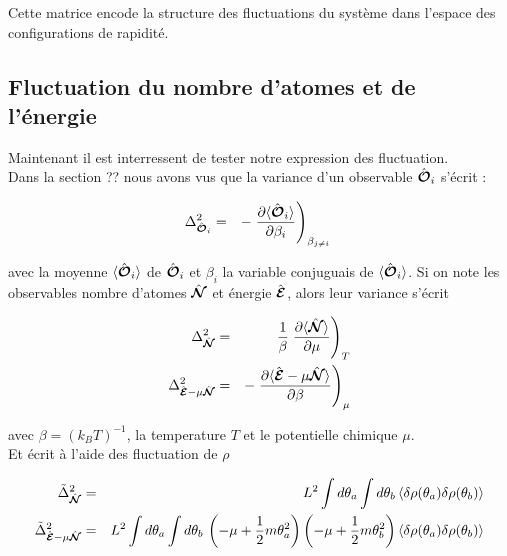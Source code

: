 Cette matrice encode la structure des fluctuations du système dans l’espace des configurations de rapidité.



\subsection{Fluctuation du nombre d'atomes et de l'énergie}

{\color{blue} 
Maintenant il est interressent de tester notre expression des fluctuation.\\
Dans la section {??} nous avons vus que la variance d'un observable $\hat{\bm{\mathcal{O}}}_i$ s'écrit :

\begin{eqnarray*}
	\Delta_{\operator{\mathcal{O}}_i}^2 & = & -  \left . \frac{ \partial \langle \operator{\mathcal{O}}_i \rangle }{ \partial \beta_i } 	 \right )_{\beta_{j \neq i } }
\end{eqnarray*}

avec la moyenne $\langle \hat{\bm{\mathcal{O}}}_i \rangle $ de  $\hat{\bm{\mathcal{O}}}_i$ et $\beta_i$ la variable conjuguais de $\langle \hat{\bm{\mathcal{O}}}_i \rangle $. Si on note les observables nombre d'atomes $\hat{\bm{\mathcal{N}}}$ et énergie $\hat{\bm{\mathcal{E}}}$, alors leur variance s'écrit 
 

\begin{eqnarray*}
	\Delta_{\hat{\bm{\mathcal{N}}}}^2  & = &  \frac{1}{\beta} \left . \frac{\partial \langle \hat{\bm{\mathcal{N}}} \rangle}{\partial \mu} \right )_T \\
	\Delta_{\hat{\bm{\mathcal{E}}}-\mu \hat{\bm{\mathcal{N}}}}^2  & = &  - \left . \frac{\partial \langle \hat{\bm{\mathcal{E}}}-\mu \hat{\bm{\mathcal{N}}} \rangle}{\partial \beta} \right )_\mu 
\end{eqnarray*}

avec $\beta = (k_B T)^{-1}$, la temperature $T$ et  le potentielle chimique $\mu$.\\

Et écrit à l'aide des fluctuation de $\rho$

\begin{eqnarray*}
	\tilde{\Delta}_{\hat{\bm{\mathcal{N}}}}^2  &= & L^2 \int d\theta_a \int d \theta_b \, \langle \delta \rho(\theta_a) \delta \rho(\theta_b) \rangle \\
	\tilde{\Delta}_{\hat{\bm{\mathcal{E}}}-\mu \hat{\bm{\mathcal{N}}}}^2  & = & L^2 \int d\theta_a \int d \theta_b \, \left ( - \mu + \frac{1}2 m \theta_a^2  \right  )\left ( - \mu + \frac{1}2 m \theta_b^2  \right  )  \langle \delta \rho(\theta_a) \delta \rho(\theta_b) \rangle
\end{eqnarray*}

}
